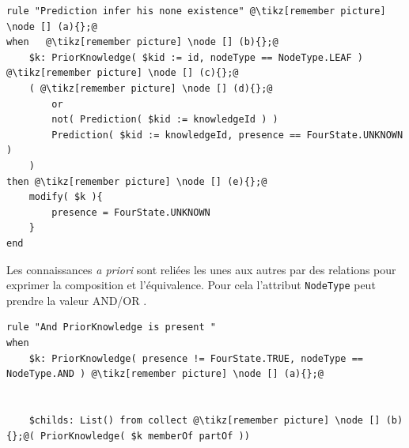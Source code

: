 \begin{refsegment}
\begin{lstlisting}[caption=Inférence de la prédiction d'absence, style=drl-style]
rule "Prediction infer his none existence" @\tikz[remember picture] \node [] (a){};@
when   @\tikz[remember picture] \node [] (b){};@
	$k: PriorKnowledge( $kid := id, nodeType == NodeType.LEAF )   @\tikz[remember picture] \node [] (c){};@
	( @\tikz[remember picture] \node [] (d){};@
		or
		not( Prediction( $kid := knowledgeId ) )
		Prediction( $kid := knowledgeId, presence == FourState.UNKNOWN )
	)
then @\tikz[remember picture] \node [] (e){};@
	modify( $k ){ 
		presence = FourState.UNKNOWN
	}
end
\end{lstlisting}

Les connaissances \textit{a priori} sont reliées les unes aux autres par des relations pour exprimer la composition et l'équivalence. Pour cela l'attribut \texttt{NodeType} peut prendre la valeur AND/OR .

\begin{lstlisting}[caption=Inférence de la prédiction de présence à travers les connaissances, style=drl-style]
rule "And PriorKnowledge is present "
when
	$k: PriorKnowledge( presence != FourState.TRUE, nodeType == NodeType.AND ) @\tikz[remember picture] \node [] (a){};@
	
    
	$childs: List() from collect @\tikz[remember picture] \node [] (b){};@( PriorKnowledge( $k memberOf partOf )) 
	

\end{lstlisting}
\end{refsegment}
